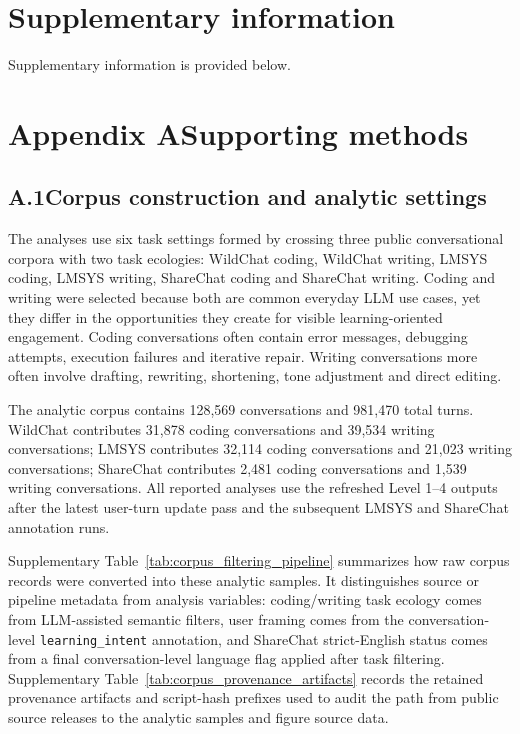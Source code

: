 \clearpage
\section*{Supplementary information}
Supplementary information is provided below.

\section*{Appendix A\quad Supporting methods}
\setcounter{table}{0}
\renewcommand{\thetable}{A\arabic{table}}

\subsection*{A.1\quad Corpus construction and analytic settings}

The analyses use six task settings formed by crossing three public conversational corpora with two task ecologies: WildChat coding, WildChat writing, LMSYS coding, LMSYS writing, ShareChat coding and ShareChat writing. Coding and writing were selected because both are common everyday LLM use cases, yet they differ in the opportunities they create for visible learning-oriented engagement. Coding conversations often contain error messages, debugging attempts, execution failures and iterative repair. Writing conversations more often involve drafting, rewriting, shortening, tone adjustment and direct editing.

The analytic corpus contains 128,569 conversations and 981,470 total turns. WildChat contributes 31,878 coding conversations and 39,534 writing conversations; LMSYS contributes 32,114 coding conversations and 21,023 writing conversations; ShareChat contributes 2,481 coding conversations and 1,539 writing conversations. All reported analyses use the refreshed Level 1--4 outputs after the latest user-turn update pass and the subsequent LMSYS and ShareChat annotation runs.

Supplementary Table~\ref{tab:corpus_filtering_pipeline} summarizes how raw corpus records were converted into these analytic samples. It distinguishes source or pipeline metadata from analysis variables: coding/writing task ecology comes from LLM-assisted semantic filters, user framing comes from the conversation-level \texttt{learning\_intent} annotation, and ShareChat strict-English status comes from a final conversation-level language flag applied after task filtering. Supplementary Table~\ref{tab:corpus_provenance_artifacts} records the retained provenance artifacts and script-hash prefixes used to audit the path from public source releases to the analytic samples and figure source data.


